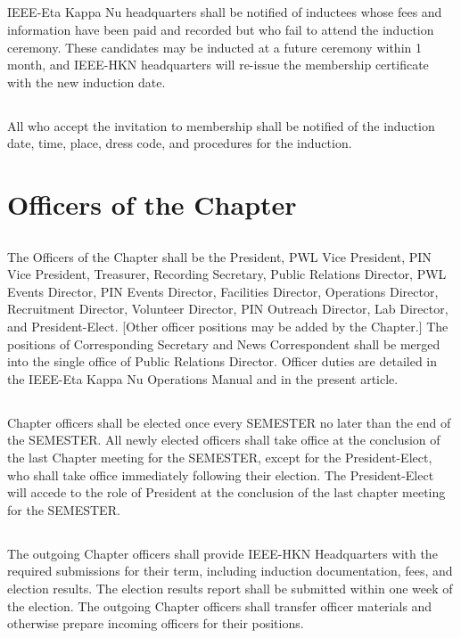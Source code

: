 \documentclass[10pt, oneside]{article}
\begin{document}
\subsection{}
IEEE-Eta Kappa Nu headquarters shall be notified of inductees whose fees and information have been paid and recorded but who fail to attend the induction ceremony. These candidates may be inducted at a future ceremony within 1 month, and IEEE-HKN headquarters will re-issue the membership certificate with the new induction date.

\subsection{}
All who accept the invitation to membership shall be notified of the induction date, time, place, dress code, and procedures for the induction.


\section{Officers of the Chapter}
\subsection{} \label{Officers}
The Officers of the Chapter shall be the President, PWL Vice President, PIN Vice President, Treasurer, Recording Secretary, Public Relations Director, PWL Events Director, PIN Events Director, Facilities Director, Operations Director, Recruitment Director, Volunteer Director, PIN Outreach Director, Lab Director, and President-Elect. [Other officer positions may be added by the Chapter.] The positions of Corresponding Secretary and News Correspondent shall be merged into the single office of Public Relations Director. Officer duties are detailed in the IEEE-Eta Kappa Nu Operations Manual and in the present article.

\subsection{}
Chapter officers shall be elected once every SEMESTER no later than the end of the SEMESTER. All newly elected officers shall take office at the conclusion of the last Chapter meeting for the SEMESTER, except for the President-Elect, who shall take office immediately following their election. The President-Elect will accede to the role of President at the conclusion of the last chapter meeting for the SEMESTER. 

\subsection{}
The outgoing Chapter officers shall provide IEEE-HKN Headquarters with the required submissions for their term, including induction documentation, fees, and election results. The election results report shall be submitted within one week of the election. The outgoing Chapter officers shall transfer officer materials and otherwise prepare incoming officers for their positions.
\end{document}

